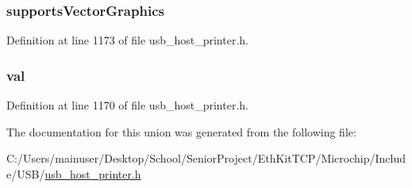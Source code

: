\subsubsection[{supports\+Vector\+Graphics}]{ supports\+Vector\+Graphics}\label{union_u_s_b___p_r_i_n_t_e_r___f_u_n_c_t_i_o_n___s_u_p_p_o_r_t_a13be599d579d2468b65dc939c6cd0b44}


Definition at line 1173 of file usb\+\_\+host\+\_\+printer.\+h.

\hypertarget{union_u_s_b___p_r_i_n_t_e_r___f_u_n_c_t_i_o_n___s_u_p_p_o_r_t_a1ba23d624885cedce131033610c85094}{}
\subsubsection[{val}]{ val}\label{union_u_s_b___p_r_i_n_t_e_r___f_u_n_c_t_i_o_n___s_u_p_p_o_r_t_a1ba23d624885cedce131033610c85094}


Definition at line 1170 of file usb\+\_\+host\+\_\+printer.\+h.



The documentation for this union was generated from the following file\+:\begin{DoxyCompactItemize}
\item 
C\+:/\+Users/mainuser/\+Desktop/\+School/\+Senior\+Project/\+Eth\+Kit\+T\+C\+P/\+Microchip/\+Include/\+U\+S\+B/\hyperlink{usb__host__printer_8h}{usb\+\_\+host\+\_\+printer.\+h}\end{DoxyCompactItemize}
